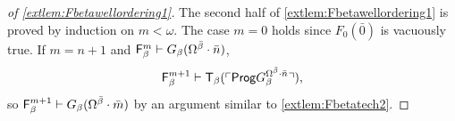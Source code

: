 \documentclass[UKenglish,cleveref,DIV=12]{scrartcl}
\let\forall\forallAlt
\theoremstyle{definition}
\theoremstyle{definition}
\begin{document}
\begin{proof}[of \cref{extlem:Fbetawellordering1}]
The second half of \cref{extlem:Fbetawellordering1} is proved by induction on $m<\omega$. The case $m=0$ holds since $F_0(\bar0)$ is vacuously true. If $m=n+1$ and $\mathsf{F}_\beta^m\vdash G_\beta(\Omega^{\bar\beta}\cdot\bar n)$,
\begin{align*}
 \mathsf{F}_\beta^{m+1}\vdash \mathsf{T}_\beta(\ulcorner{\mathsf{Prog}G_\beta^{\Omega^{\bar\beta}\cdot\bar n}}\urcorner),
\end{align*}
so $\mathsf{F}_\beta^{m+1}\vdash G_\beta(\Omega^{\bar\beta}\cdot\bar m)$ by an argument similar to \cref{extlem:Fbetatech2}.
%
%
%
%
%

\end{proof}
\end{document}
